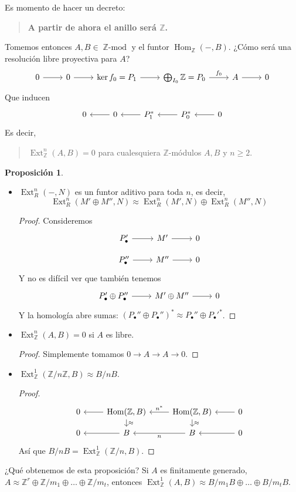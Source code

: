 \documentclass[spanish]{book}
\theoremstyle{definition}
\newtheorem*{prop}{Proposición}
\newcommand{\Z}{\mathbb{Z}}
\DeclareMathOperator{\ZMod}{\mathbb{Z}\text{-}mod}
\DeclareMathOperator{\Hom}{Hom}
\DeclareMathOperator{\Ext}{Ext}
\begin{document}
Es momento de hacer un decreto:
\begin{quotation}
	\textbf{A partir de ahora el anillo será $\Z$.}
\end{quotation}
Tomemos entonces $A,B\in\ZMod$ y el funtor $\Hom_\Z(-,B)$. ¿Cómo será una resolución libre proyectiva para $A$?
\[\begin{tikzcd}
	0\arrow[r]&0\arrow[r]&\ker f_0=P_1\arrow[r]&\bigoplus_{I_0}\Z=P_0\arrow[r,"f_0"]&A\arrow[r]&0
\end{tikzcd}\]
Que inducen
\[\begin{tikzcd}
	0&0\arrow[l]&P_1^*\arrow[l]&P_0^*\arrow[l]&0\arrow[l]
\end{tikzcd}\]
Es decir,
\begin{quotation}
	$\Ext^n_\Z(A,B)=0$ para cualesquiera $\Z$-módulos $A,B$ y $n\geq2$.
\end{quotation}
\begin{prop}\leavevmode
	\begin{itemize}
		\item $\Ext^n_R(-,N)$ es un funtor aditivo para toda $n$, es decir,
		\[\Ext_R^n(M'\oplus M'',N)\approx\Ext_R^n(M',N)\oplus\Ext^n_R(M'',N)\]
		\begin{proof}
			Consideremos
			\[\begin{tikzcd}[row sep=small]
				P'_\bullet\arrow[r]&M'\arrow[r]&0\\
				P''_\bullet\arrow[r]&M''\arrow[r]&0
			\end{tikzcd}\]
			Y no es difícil ver que también tenemos
			\[\begin{tikzcd}
				P'_\bullet\oplus P''_\bullet\arrow[r]&M'\oplus M''\arrow[r]&0
			\end{tikzcd}\]
			Y la homología abre sumas: $(P_\bullet''\oplus P_\bullet'')^*\approx P_\bullet''\oplus P_\bullet'^*$.
		\end{proof}
		\item $\Ext^n_\Z(A,B)=0$ si $A$ es libre.
		\begin{proof}
			Simplemente tomamos $0\to A\to A\to 0$.
		\end{proof}
		\item $\Ext^1_\Z(\Z/n\Z,B)\approx B/nB$.
		\begin{proof}
			\[\begin{tikzcd}[row sep=small]
				0&\Hom(\Z,B)\arrow[l]\arrow[d,"\approx"]&\Hom(\Z,B)\arrow[l,swap,"n^*"]\arrow[d,"\approx"]&0\arrow[l]\\
				0&B\arrow[l]&B\arrow[l,"n"]&0\arrow[l]
			\end{tikzcd}\]
			Así que $B/nB=\Ext_\Z^1(\Z/n,B)$.
		\end{proof}
	\end{itemize}
\end{prop}
¿Qué obtenemos de esta proposición? Si $A$ es finitamente generado, $A\approx\Z^r\oplus\Z/m_1\oplus\ldots\oplus\Z/m_t$, entonces $\Ext^1_\Z(A,B)\approx B/m_1B\oplus\ldots\oplus B/m_tB$.
\end{document}
